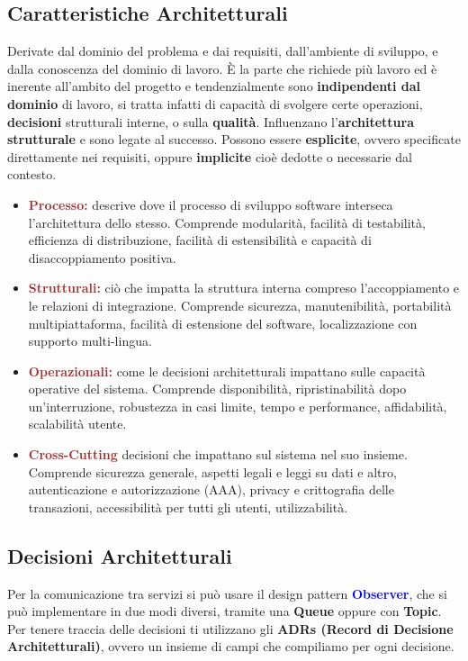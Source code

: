 \subsection{Caratteristiche Architetturali}
Derivate dal dominio del problema e dai requisiti, dall'ambiente di sviluppo, e dalla conoscenza del dominio di lavoro.
È la parte che richiede più lavoro ed è inerente all'ambito del progetto e tendenzialmente sono \textbf{indipendenti dal dominio} di lavoro, si tratta infatti di capacità di svolgere certe operazioni, \textbf{decisioni} strutturali interne, o sulla \textbf{qualità}. Influenzano l'\textbf{architettura strutturale} e sono legate al successo. Possono essere \textbf{esplicite}, ovvero specificate direttamente nei requisiti, oppure \textbf{implicite} cioè dedotte o necessarie dal contesto.
\begin{itemize}
    \item \textbf{\textcolor{brown}{Processo:}} descrive dove il processo di sviluppo software interseca l'architettura dello stesso. Comprende modularità, facilità di testabilità, efficienza di distribuzione, facilità di estensibilità e capacità di disaccoppiamento positiva.
    \item \textbf{\textcolor{brown}{Strutturali:}} ciò che impatta la struttura interna compreso l'accoppiamento e le relazioni di integrazione. Comprende sicurezza, manutenibilità, portabilità multipiattaforma, facilità di estensione del software, localizzazione con supporto multi-lingua.
    \item \textbf{\textcolor{brown}{Operazionali:}} come le decisioni architetturali impattano sulle capacità operative del sistema. Comprende disponibilità, ripristinabilità dopo un'interruzione, robustezza in casi limite, tempo e performance, affidabilità, scalabilità utente.
    \item \textbf{\textcolor{brown}{Cross-Cutting}} decisioni che impattano sul sistema nel suo insieme. Comprende sicurezza generale, aspetti legali e leggi su dati e altro, autenticazione e autorizzazione (AAA), privacy e crittografia delle transazioni, accessibilità per tutti gli utenti, utilizzabilità.
\end{itemize}

\subsection{Decisioni Architetturali}
Per la comunicazione tra servizi si può usare il design pattern \textbf{\textcolor{blue}{Observer}}, che si può implementare in due modi diversi, tramite una \textbf{Queue} oppure con \textbf{Topic}.
Per tenere traccia delle decisioni ti utilizzano gli \textbf{ADRs (Record di Decisione Architetturali)}, ovvero un insieme di campi che compiliamo per ogni decisione.

